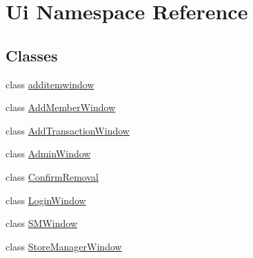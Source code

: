 \hypertarget{namespace_ui}{}\section{Ui Namespace Reference}
\label{namespace_ui}
\subsection*{Classes}
\begin{DoxyCompactItemize}
\item 
class \mbox{\hyperlink{class_ui_1_1additemwindow}{additemwindow}}
\item 
class \mbox{\hyperlink{class_ui_1_1_add_member_window}{Add\+Member\+Window}}
\item 
class \mbox{\hyperlink{class_ui_1_1_add_transaction_window}{Add\+Transaction\+Window}}
\item 
class \mbox{\hyperlink{class_ui_1_1_admin_window}{Admin\+Window}}
\item 
class \mbox{\hyperlink{class_ui_1_1_confirm_removal}{Confirm\+Removal}}
\item 
class \mbox{\hyperlink{class_ui_1_1_login_window}{Login\+Window}}
\item 
class \mbox{\hyperlink{class_ui_1_1_s_m_window}{S\+M\+Window}}
\item 
class \mbox{\hyperlink{class_ui_1_1_store_manager_window}{Store\+Manager\+Window}}
\end{DoxyCompactItemize}
